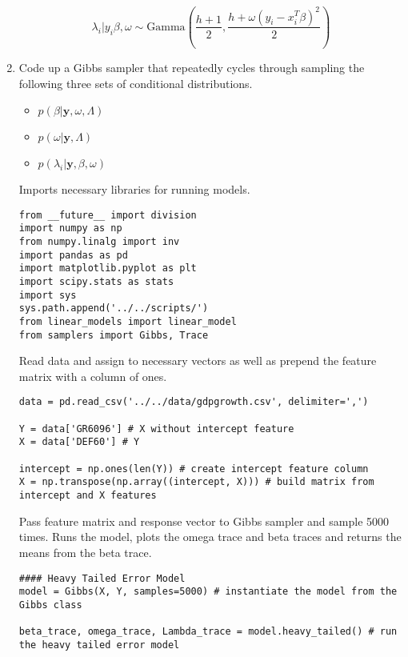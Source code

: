 \documentclass[10pt]{article}
\newcommand{\by}{\mathbf{y}}
\begin{document}
\begin{enumerate}[label=(\Alph*)]
      $$\lambda_i | y_i \beta, \omega \sim \text{Gamma}\left(\frac{h+1}{2}, \frac{h + \omega(y_i - x_i^T \beta)^2}{2} \right)$$

    \item Code up a Gibbs sampler that repeatedly cycles through sampling the following three sets of conditional distributions.

      \begin{itemize}
        \item $p(\beta | \by, \omega, \Lambda)$
        \item $p(\omega | \by, \Lambda)$
        \item $p(\lambda_i | \by, \beta, \omega)$
      \end{itemize}

      Imports necessary libraries for running models.

        \begin{lstlisting}
from __future__ import division
import numpy as np 
from numpy.linalg import inv
import pandas as pd
import matplotlib.pyplot as plt
import scipy.stats as stats
import sys
sys.path.append('../../scripts/')
from linear_models import linear_model
from samplers import Gibbs, Trace
        \end{lstlisting}

      Read data and assign to necessary vectors as well as prepend the feature matrix with a column of ones. 

        \begin{lstlisting}
data = pd.read_csv('../../data/gdpgrowth.csv', delimiter=',')

Y = data['GR6096'] # X without intercept feature
X = data['DEF60'] # Y 

intercept = np.ones(len(Y)) # create intercept feature column
X = np.transpose(np.array((intercept, X))) # build matrix from intercept and X features
        \end{lstlisting}

        Pass feature matrix and response vector to Gibbs sampler and sample 5000 times. Runs the model, plots the omega trace and beta traces and returns the means from the beta trace.

        \begin{lstlisting}
#### Heavy Tailed Error Model
model = Gibbs(X, Y, samples=5000) # instantiate the model from the Gibbs class

beta_trace, omega_trace, Lambda_trace = model.heavy_tailed() # run the heavy tailed error model


\end{lstlisting}
\end{enumerate}
\end{document}
